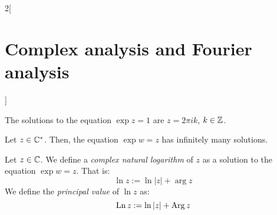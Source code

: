 \documentclass[../../../main.tex]{subfiles}
\begin{document}
\begin{multicols}{2}[\section{Complex analysis and Fourier analysis}]
\begin{theorem}
  \end{theorem}
  \begin{prop}
    The solutions to the equation $\exp{z}=1$ are $z=2\pi i k$, $k\in\mathbb{Z}$.
  \end{prop}
  \begin{corollary}
    Let $z\in\mathbb{C}^*$. Then, the equation $\exp{w}=z$ has infinitely many solutions.
  \end{corollary}
  \begin{definition}
    Let $z\in \mathbb{C}$. We define a \emph{complex natural logarithm} of $z$ as a solution to the equation $\exp{w}=z$. That is: $$\ln z:=\ln |z|+\arg z$$
    We define the \emph{principal value} of $\ln z$ as: $$\operatorname{Ln} z:=\ln |z|+\operatorname{Arg} z$$
  \end{definition}
\end{multicols}
\end{document}
